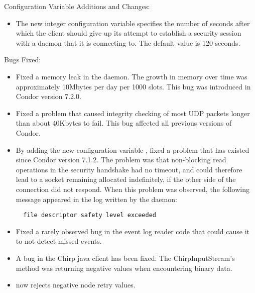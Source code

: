 \noindent Configuration Variable Additions and Changes:

\begin{itemize}

\item The new integer configuration variable
   specifies the
  number of seconds after which the client should give up its attempt to
  establish a security session with a daemon that it is connecting to.
  The default value is 120 seconds.

\end{itemize}

\noindent Bugs Fixed:

\begin{itemize}

\item Fixed a memory leak in the  daemon.
  The growth in memory over time was approximately 10Mbytes per day
  per 1000 slots.
  This bug was introduced in Condor version 7.2.0.

\item Fixed a problem that caused integrity checking of most UDP packets
  longer than about 40Kbytes to fail.
  This bug affected all previous versions of Condor.

\item By adding the new configuration variable
  , fixed a problem
  that has existed since Condor version 7.1.2. 
  The problem was that non-blocking read
  operations in the security handshake had no timeout,
  and could therefore lead to a socket remaining allocated indefinitely,
  if the other side of the connection did not respond.
  When this problem was observed,
  the following message appeared in the log written by the 
  daemon:
\begin{verbatim}
  file descriptor safety level exceeded
\end{verbatim}

\item Fixed a rarely observed bug in the event log reader code
  that could cause it to not detect missed events.

\item A bug in the Chirp java client has been fixed.
  The ChirpInputStream's  method was returning
  negative values when encountering binary data.

\item {} now rejects negative node retry values.


\end{itemize}
